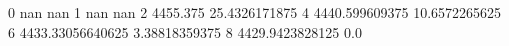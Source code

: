 0 nan nan
1 nan nan
2 4455.375 25.4326171875
4 4440.599609375 10.6572265625
6 4433.33056640625 3.38818359375
8 4429.9423828125 0.0
